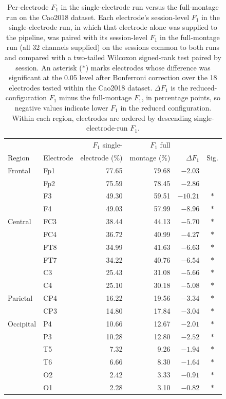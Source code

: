 \documentclass[journal,twoside,web]{ieeecolor}
\begin{document}
\begin{table}[htbp]
  \centering
  \renewcommand{\baselinestretch}{1}\normalsize
  \caption{Per-electrode $F_1$ in the single-electrode run versus the full-montage run on the Cao2018 dataset. Each electrode's session-level $F_1$ in the single-electrode run, in which that electrode alone was supplied to the pipeline, was paired with its session-level $F_1$ in the full-montage run (all 32 channels supplied) on the sessions common to both runs and compared with a two-tailed Wilcoxon signed-rank test paired by session. An asterisk ($*$) marks electrodes whose difference was significant at the 0.05 level after Bonferroni correction over the 18 electrodes tested within the Cao2018 dataset. $\Delta F_1$ is the reduced-configuration $F_1$ minus the full-montage $F_1$, in percentage points, so negative values indicate lower $F_1$ in the reduced configuration. Within each region, electrodes are ordered by descending single-electrode-run $F_1$.}
  \label{tab:app_single_cao2018}
  \footnotesize
  \setlength{\tabcolsep}{2.5pt}
  \begin{tabular}{@{}llrrrc@{}}
    \toprule
     &  & $F_1$ single- & $F_1$ full &  & \\
    Region & Electrode & electrode (\%) & montage (\%) & $\Delta F_1$ & Sig. \\
    \midrule
    Frontal & Fp1 & 77.65 & 79.68 & $-2.03$ & \\
     & Fp2 & 75.59 & 78.45 & $-2.86$ & \\
     & F3 & 49.30 & 59.51 & $-10.21$ & $*$ \\
     & F4 & 49.03 & 57.99 & $-8.96$ & $*$ \\
    \addlinespace
    Central & FC3 & 38.44 & 44.13 & $-5.70$ & $*$ \\
     & FC4 & 36.72 & 40.99 & $-4.27$ & $*$ \\
     & FT8 & 34.99 & 41.63 & $-6.63$ & $*$ \\
     & FT7 & 34.22 & 40.76 & $-6.54$ & $*$ \\
     & C3 & 25.43 & 31.08 & $-5.66$ & $*$ \\
     & C4 & 25.10 & 30.18 & $-5.08$ & $*$ \\
    \addlinespace
    Parietal & CP4 & 16.22 & 19.56 & $-3.34$ & $*$ \\
     & CP3 & 14.80 & 17.84 & $-3.04$ & $*$ \\
    \addlinespace
    Occipital & P4 & 10.66 & 12.67 & $-2.01$ & $*$ \\
     & P3 & 10.28 & 12.80 & $-2.52$ & $*$ \\
     & T5 & 7.32 & 9.26 & $-1.94$ & $*$ \\
     & T6 & 6.66 & 8.30 & $-1.64$ & $*$ \\
     & O2 & 2.42 & 3.33 & $-0.91$ & $*$ \\
     & O1 & 2.28 & 3.10 & $-0.82$ & $*$ \\
    \bottomrule
  \end{tabular}
\end{table}

\clearpage


\end{document}
